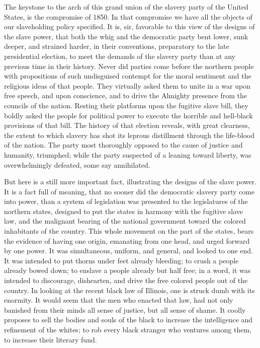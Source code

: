 The keystone to the arch of this grand union of the slavery party of the
United States, is the compromise of 1850. In that compromise we have all
the objects of our slaveholding policy specified. It is, sir, favorable
to this view of the designs of the slave power, that both the whig and
the democratic party bent lower, sunk deeper, and strained harder, in
their conventions, preparatory to the late presidential election, to
meet the demands of the slavery party than at any previous time in their
history. Never did parties come before the northern people with
propositions of such {}undisguised contempt for the moral sentiment and
the religious ideas of that people. They virtually asked them to unite
in a war upon free speech, and upon conscience, and to drive the
Almighty presence from the councils of the nation. Resting their
platforms upon the fugitive slave bill, they boldly asked the people for
political power to execute the horrible and hell-black provisions of
that bill. The history of that election reveals, with great clearness,
the extent to which slavery has shot its leprous distillment through the
life-blood of the nation. The party most thoroughly opposed to the cause
of justice and humanity, triumphed; while the party suspected of a
leaning toward liberty, was overwhelmingly defeated, some say
annihilated.

But here is a still more important fact, illustrating the designs of the
slave power. It is a fact full of meaning, that no sooner did the
democratic slavery party come into power, than a system of legislation
was presented to the legislatures of the northern states, designed to
put the states in harmony with the fugitive slave law, and the malignant
bearing of the national government toward the colored inhabitants of the
country. This whole movement on the part of the states, bears the
evidence of having one origin, emanating from one head, and urged
forward by one power. It was simultaneous, uniform, and general, and
looked to one end. It was intended to put thorns under feet already
bleeding; to crush a people already bowed down; to enslave a people
already but half free; in a word, it was intended to discourage,
dishearten, and drive the free colored people out of the country. In
looking at the recent black law of Illinois, one is struck dumb with its
enormity. It would seem that the men who enacted that law, had not only
banished from their minds all sense of justice, but all sense of shame.
It coolly proposes to sell the bodies and souls of the black to increase
the intelligence and refinement of the whites; to rob every black
stranger who ventures among them, to increase their literary fund.

